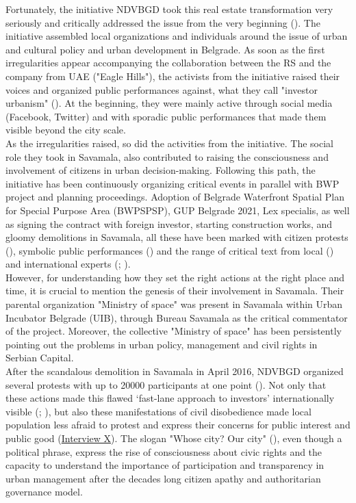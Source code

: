 \documentclass[11pt]{report}
\begin{document}
Fortunately, the initiative NDVBGD took this real estate transformation very seriously and critically addressed the issue from the very beginning (\cite{NeDa(vi)moBeograd}). %
The initiative assembled local organizations and individuals around the issue of urban and cultural policy and urban development in Belgrade.
As soon as the first irregularities appear accompanying the collaboration between the RS and the company from UAE ("Eagle Hills"), the activists from the initiative raised their voices and organized public performances against, what they call "investor urbanism" (\cite{SlobodnaEvropa2014}).%
 At the beginning, they were mainly active through social media (Facebook, Twitter) and with sporadic public performances that made them visible beyond the city scale.
\\

As the irregularities raised, so did the activities from the initiative.
The social role they took in Savamala, also contributed to raising the consciousness and involvement of citizens in urban decision-making.
Following this path, the initiative has been continuously organizing critical events in parallel with BWP project and planning proceedings.
Adoption of Belgrade Waterfront Spatial Plan for Special Purpose Area (BWPSPSP), GUP Belgrade 2021, Lex specialis, as well as signing the contract with foreign investor, starting construction works, and gloomy demolitions in Savamala, all these have been marked with citizen protests (\cite{media?}), symbolic public performances (\cite{media?}) and the range of critical text from local (\cite{media?}) and international experts (\cite{TheSpectacleBlog2014}; \citealt{krusche_bureau_2015}).
\\

However, for understanding how they set the right actions at the right place and time, it is crucial to mention the genesis of their involvement in Savamala.
Their parental organization "Ministry of space" was present in Savamala within Urban Incubator Belgrade (UIB), through Bureau Savamala as the critical commentator of the project.
Moreover, the collective "Ministry of space" has been persistently pointing out the problems in urban policy, management and civil rights in Serbian Capital.
\\

After the scandalous demolition in Savamala in April 2016, NDVBGD organized several protests with up to 20000 participants at one point (\cite{BalkanInsight2016}).
Not only that these actions made this flawed ‘fast-lane approach to investors’ internationally visible (\citealt{eror_belgrades_2015}; \citealt{wright_belgrade_2015}), but also these manifestations of civil disobedience made local population less afraid to protest and express their concerns for public interest and public good
(\href{InterviewX}{Interview X}).
The slogan "Whose city? Our city" (\citealt{tulimirovic_protest_2016}), even though a political phrase, express the rise of consciousness about civic rights and the capacity to understand the importance of participation and transparency in urban management after the decades long citizen apathy and authoritarian governance model.
\\
\end{document}
